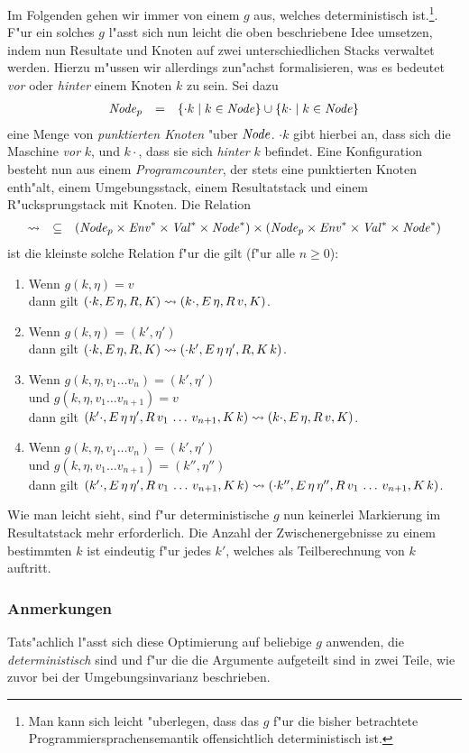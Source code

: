 \documentclass[12pt,a4paper]{article}
\begin{document}
Im Folgenden gehen wir immer von einem $g$ aus, welches deterministisch ist.\footnote{Man kann sich leicht
"uberlegen, dass das $g$ f"ur die bisher betrachtete Programmiersprachensemantik offensichtlich deterministisch
ist.}. F"ur ein solches $g$ l"asst sich nun leicht die oben beschriebene Idee umsetzen, indem nun Resultate und
Knoten auf zwei unterschiedlichen Stacks verwaltet werden. Hierzu m"ussen wir allerdings zun"achst formalisieren,
was es bedeutet \emph{vor} oder \emph{hinter} einem Knoten $k$ zu sein. Sei dazu
\[\begin{array}{rcl}
  \mathit{Node}_p &=& \{\cdot k \mid k \in \mathit{Node}\} \cup \{k \cdot \mid k \in \mathit{Node}\}
\end{array}\]
eine Menge von \emph{punktierten Knoten} "uber $\mathit{Node}$. $\cdot k$ gibt hierbei an, dass sich die Maschine
\emph{vor} $k$, und $k \cdot$, dass sie sich \emph{hinter} $k$ befindet. Eine Konfiguration besteht nun
aus einem \emph{Programcounter}, der stets eine punktierten Knoten enth"alt, einem Umgebungsstack,
einem Resultatstack und einem R"ucksprungstack mit Knoten. Die Relation
\[\begin{array}{rcl}
  \rightsquigarrow &\subseteq& (\mathit{Node}_p \times \mathit{Env}^* \times \mathit{Val}^* \times \mathit{Node}^*) \times (\mathit{Node}_p \times \mathit{Env}^* \times \mathit{Val}^* \times \mathit{Node}^*)
\end{array}\]
ist die kleinste solche Relation f"ur die gilt (f"ur alle $n \ge 0$):
\begin{enumerate}
\item Wenn $g(k,\eta) = v$ \\
  dann gilt $(\cdot k,E\,\eta,R,K) \rightsquigarrow (k\cdot,E\,\eta,R\,v,K)$.
\item Wenn $g(k,\eta) = (k',\eta')$ \\
  dann gilt $(\cdot k,E\,\eta,R,K) \rightsquigarrow (\cdot k',E\,\eta\,\eta',R,K\,k)$.
\item Wenn $g(k,\eta,v_1 \ldots v_n) = (k',\eta')$ \\
  und $g(k,\eta,v_1 \ldots v_{n+1}) = v$ \\
  dann gilt $(k'\cdot,E\,\eta\,\eta',R\,v_1\,\ldots\,v_{n+1},K\,k) \rightsquigarrow (k\cdot,E\,\eta,R\,v,K)$.
\item Wenn $g(k,\eta,v_1 \ldots v_n) = (k',\eta')$ \\
  und $g(k,\eta,v_1 \ldots v_{n+1}) = (k'',\eta'')$ \\
  dann gilt $(k'\cdot,E\,\eta\,\eta',R\,v_1\,\ldots\,v_{n+1},K\,k) \rightsquigarrow (\cdot k'',E\,\eta\,\eta'',R\,v_1\,\ldots\,v_{n+1},K\,k)$.
\end{enumerate}
Wie man leicht sieht, sind f"ur deterministische $g$ nun keinerlei Markierung im Resultatstack mehr erforderlich.
Die Anzahl der Zwischenergebnisse zu einem bestimmten $k$ ist eindeutig f"ur jedes $k'$, welches als Teilberechnung
von $k$ auftritt.


\subsubsection{Anmerkungen}

Tats"achlich l"asst sich diese Optimierung auf beliebige $g$ anwenden, die \emph{deterministisch} sind und f"ur
die die Argumente aufgeteilt sind in zwei Teile, wie zuvor bei der Umgebungsinvarianz beschrieben.
\end{document}
